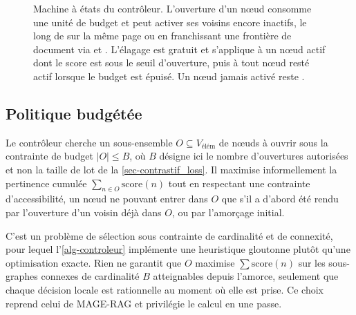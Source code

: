\begin{figure}[t]
\centering
{}
\caption[Machine à états du contrôleur]{Machine à états du contrôleur.
L'ouverture d'un nœud consomme une unité de budget et peut activer ses voisins
encore inactifs, le long de  sur la même page ou en
franchissant une frontière de document via  et .
L'élagage est gratuit et s'applique à un nœud actif dont le score est sous le seuil
d'ouverture, puis à tout nœud resté actif lorsque le budget est épuisé. Un nœud
jamais activé reste .}
\label{fig-etats}
\end{figure}
 
\subsection{Politique  budgétée}
\label{sec-controleur_politique}
 
Le contrôleur cherche un sous-ensemble $O \subseteq V_{\text{élém}}$ de nœuds à
ouvrir sous la contrainte de budget $|O| \leq B$, où $B$ désigne ici le nombre
d'ouvertures autorisées et non la taille de lot de la \cref{sec-contrastif_loss}.
Il maximise informellement la pertinence cumulée $\sum_{n \in O}
\mathrm{score}(n)$ tout en respectant une contrainte d'accessibilité, un nœud ne
pouvant entrer dans $O$ que s'il a d'abord été rendu  par
l'ouverture d'un voisin déjà dans $O$, ou par l'amorçage initial.
 
C'est un problème de sélection sous contrainte de cardinalité et de connexité,
pour lequel l'\cref{alg-controleur} implémente une heuristique 
gloutonne plutôt qu'une optimisation exacte. Rien ne garantit que $O$ maximise
$\sum \mathrm{score}(n)$ sur les sous-graphes connexes de cardinalité $B$
atteignables depuis l'amorce, seulement que chaque décision locale est
rationnelle au moment où elle est prise. Ce choix reprend celui de MAGE-RAG et
privilégie le calcul en une passe.
 
